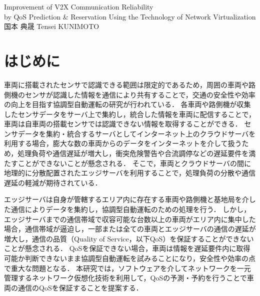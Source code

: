 \documentclass[a4paper,10pt,twocolumn,uplatex]{jsarticle}
\date{30}
\begin{document}
{Improvement of V2X Communication Reliability\\by QoS Prediction \& Reservation Using the Technology of Network Virtualization}
{国本 典晟}
{Tensei KUNIMOTO}

\section{はじめに}
車両に搭載されたセンサで認識できる範囲は限定的であるため，周囲の車両や路側機のセンサが認識した情報を通信により共有することで，交通の安全性や効率の向上を目指す協調型自動運転の研究が行われている\cite{Cooperative}．
各車両や路側機が収集したセンサデータをサーバ上で集約し，統合した情報を車両に配信することで，車両は自車両の搭載センサでは認識できない情報を取得することができる．
センサデータを集約・統合するサーバとしてインターネット上のクラウドサーバを利用する場合，膨大な数の車両からのデータをインターネットを介して扱うため，処理負荷や通信遅延が増大し，衝突危険警告や合流調停などの遅延要件を満たすことができないことが懸念される．
そこで，車両とクラウドサーバの間に地理的に分散配置されたエッジサーバを利用することで，処理負荷の分散や通信遅延の軽減が期待されている\cite{MEC}．\par
エッジサーバは自身が管轄するエリア内に存在する車両や路側機と基地局を介した通信によりデータを集約し，協調型自動運転のための処理を行う．
しかし，エッジサーバまでの通信帯域で収容可能な台数以上の車両がエリア内に集中した場合，通信帯域が逼迫し，一部または全ての車両とエッジサーバの通信の遅延が増大し，通信の品質（Quality of Service，以下QoS）を保証することができないことが懸念される\cite{QoS}．
QoSを保証できない場合，車両は情報を遅延要件内に取得可能か判断できないまま協調型自動運転を試みることになり，安全性や効率の点で重大な問題となる．
本研究では，ソフトウェアを介してネットワークを一元管理するネットワーク仮想化技術を利用して，QoSの予測・予約を行うことで車両の通信のQoSを保証することを提案する．
\end{document}
